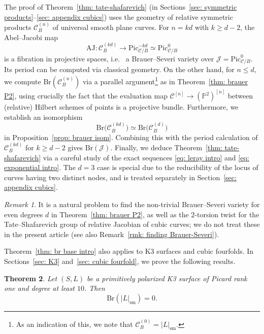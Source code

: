 \documentclass[11pt]{amsart}
\theoremstyle{plain}
\newtheorem{thm}{Theorem}[section]
\theoremstyle{definition}
\theoremstyle{remark}
\newtheorem{rmk}[thm]{Remark}
\begin{document}
The proof of Theorem~\ref{thm: tate-shafarevich} (in Sections~\ref{sec: symmetric products}--\ref{sec: appendix cubics}) uses the geometry of relative symmetric products $\mathcal{C}^{(n)}_B$ of universal smooth plane curves. For $n = kd$ with $k\geq d-2$, the Abel--Jacobi map
\[
\mathrm{AJ}: \mathcal{C}_B^{(kd)} \to \mathrm{Pic}^{-kd}_{\mathcal{C}/B} \simeq \mathrm{Pic}^0_{\mathcal{C}/B}
\]
is a fibration in projective spaces, i.e.~ a Brauer--Severi variety over $\mathcal{J} = \mathrm{Pic}^0_{\mathcal{C}/B}$. Its period can be computed via classical geometry. On the other hand, for $n\leq d$, we compute $\mathrm{Br}(\mathcal{C}^{(n)}_B)$ via a parallel argument\footnote{As an indication of this, we note that $\mathcal{C}_B^{(0)} =  |L|_\mathrm{sm}$.} as in Theorem~\ref{thm: brauer P2}, using crucially the fact that the evaluation map $\mathcal{C}^{[n]}\to (\mathbb P^2)^{[n]}$ between (relative) Hilbert schemes of points is a projective bundle. Furthermore, we establish an isomorphism
\[
\mathrm{Br}\Big(\mathcal{C}_B^{(kd)}\Big) \simeq \mathrm{Br}\Big(\mathcal{C}_B^{(d)}\Big)
\]
in Proposition~\ref{prop: brauer isom}. Combining this with the period calculation of $\mathcal{C}_B^{(kd)}$ for $k \geq d-2$ gives $\mathrm{Br}(\mathcal{J})$. Finally, we deduce Theorem~\ref{thm: tate-shafarevich} via a careful study of the exact sequences \eqref{eq: leray intro} and \eqref{eq: exponential intro}. The $d=3$ case is special due to the reducibility of the locus of curves having two distinct nodes, and is treated separately in Section~\ref{sec: appendix cubics}.

\begin{rmk}
    It is a natural problem to find the non-trivial Brauer--Severi variety for even degrees $d$ in Theorem~\ref{thm: brauer P2}, as well as the $2$-torsion twist for the Tate--Shafarevich group of  relative Jacobian of cubic curves; we do not treat these in the present article (see also Remark~\ref{rmk: finding Brauer-Severi}). 
\end{rmk}

Theorem~\ref{thm: br base intro} also applies to K3 surfaces and cubic fourfolds. In Sections~\ref{sec: K3} and~\ref{sec: cubic fourfold}, we prove the following results.

\begin{thm}\label{thm: brauer k3}
    Let $(S, L)$ be a primitively polarized K3 surface of Picard rank one and degree at least $10$. Then
    \[
    \mathrm{Br}(|L|_\mathrm{sm}) = 0.
    \]
\end{thm}
\end{document}
